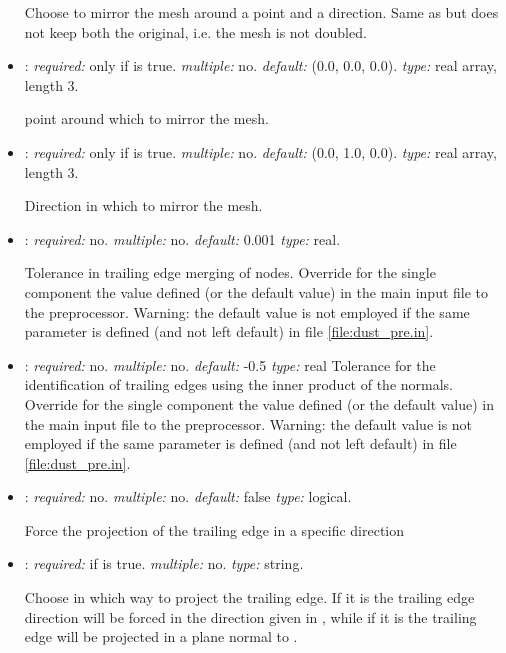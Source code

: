 \begin{itemize}
Choose to mirror the mesh around a point and a direction. Same as  but does not keep both the original, i.e. the mesh is not doubled.

\item {}: \textit{required:} only if  is true. \textit{multiple:} no. \textit{default:} (0.0, 0.0, 0.0). \textit{type:} real array, length 3.

point around which to mirror the mesh.

\item {}: \textit{required:} only if  is true. \textit{multiple:} no. \textit{default:} (0.0, 1.0, 0.0). \textit{type:} real array, length 3.

Direction in which to mirror the mesh.

\item {}: \textit{required:} no. \textit{multiple:} no. \textit{default:} 0.001 \textit{type:} real.

Tolerance in trailing edge merging of nodes. Override for the single component the value defined (or the default value) in the main input file to the preprocessor. Warning: the default value is not employed if the same parameter is defined (and not left default) in file \ref{file:dust_pre.in}. 

\item {}: \textit{required:} no. \textit{multiple:} no. \textit{default:} -0.5 \textit{type:} real
Tolerance for the identification of trailing edges using the inner product of the normals.
Override for the single component the value defined (or the default value) in the main input file to the preprocessor. Warning: the default value is not employed if the same parameter is defined (and not left default) in file \ref{file:dust_pre.in}. 

\item {}: \textit{required:} no. \textit{multiple:} no. \textit{default:} false \textit{type:} logical.

Force the projection of the trailing edge in a specific direction

\item {}: \textit{required:} if  is true. \textit{multiple:} no. \textit{type:} string.

Choose in which way to project the trailing edge. If it is  the trailing edge direction will be forced in the direction given in , while if it is  the trailing edge will be projected in a plane normal to .


\end{itemize}
